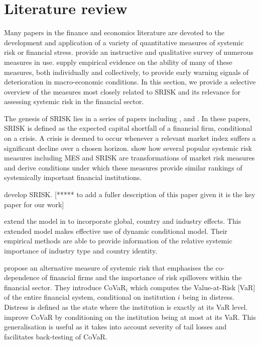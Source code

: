 \documentclass[12pt]{article}
\begin{document}
\section{Literature review}\label{litrev}
Many papers in the finance and economics literature are devoted to the development and application of a variety of quantitative measures of systemic risk or financial stress. \cite{Bisias2012} provide an instructive and qualitative survey of numerous measures in use. \cite{Giglio2015} supply empirical evidence on the ability of many of these measures, both individually and collectively, to provide early warning signals of deterioration in macro-economic conditions. In this section, we provide a selective overview of the measures most closely related to SRISK and its relevance for assessing systemic risk in the financial sector. 

The genesis of SRISK lies in a series of papers including \cite{acharya2012capital}, \cite{acharya2012measuring} and \cite{brownlees2010volatility}. In these papers, SRISK is defined as the expected capital shortfall of a financial firm, conditional on a crisis. A crisis is deemed to occur whenever a relevant market index suffers a significant decline over a chosen horizon. \cite{Benoit2013} show how several popular systemic risk measures including MES and SRISK are transformations of market risk measures and derive conditions under which these measures provide similar rankings of systemically important financial institutions.


\cite{brownlees2015} develop SRISK. [***** to add a fuller description of this paper given it is the key paper for our work] 

\cite{Engle2015} extend the model in \cite{brownlees2015} to incorporate global, country and industry effects. This extended model makes effective use of \cite{Engle2014dcb} dynamic conditional model. Their empirical methods are able to provide information of the relative systemic importance of industry type and country identity. 

\cite{adrian2011covar} propose an alternative measure of systemic risk that emphasises the co-dependence of financial firms and the importance of risk spillovers within the financial sector. They introduce CoVaR$_i$ which computes the Value-at-Risk [VaR] of the entire financial system, conditional on institution $i$ being in distress. Distress is defined as the state where the institution is exactly at its VaR level. \cite{Girardi2013} improve CoVaR by conditioning on the institution being at most at its VaR. This generalisation is useful as it takes into account severity of tail losses and facilitates back-testing of CoVaR. 
\end{document}
